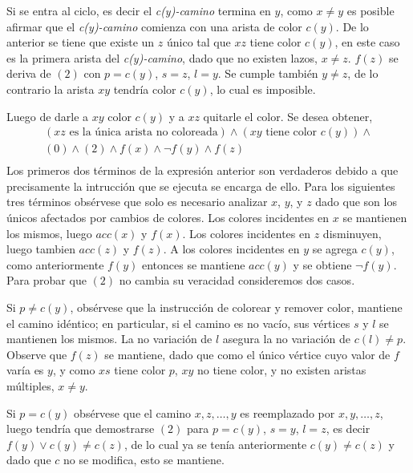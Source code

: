 \documentclass[../np-approximations.tex]{subfiles}
\begin{document}
Si se entra al ciclo, es decir el \emph{c(y)-camino} termina en $y$,
como $x \neq y$ es posible afirmar que el \emph{c(y)-camino} 
comienza con una arista de color $c(y)$. De lo anterior se tiene 
que existe un $z$ único tal que $xz$ tiene color $c(y)$, en este 
caso es la primera arista del \emph{c(y)-camino}, dado que no 
existen lazos, $x \neq z$. $f(z)$ se deriva de $(2)$ con $p=c(y)$,
$s=z$, $l=y$. Se cumple también $y \neq z$, de lo contrario la 
arista $xy$ tendría color $c(y)$, lo cual es imposible.

Luego de darle a $xy$ color $c(y)$ y a $xz$ quitarle el color.
Se desea obtener,
\begin{multline*}
	(xz \text{ es la única arista no coloreada}) \wedge
	(xy \text{ tiene color } c(y)) \wedge \\
	(0) \wedge (2) \wedge f(x) \wedge \neg f(y) \wedge f(z) \\
\end{multline*}
Los primeros dos términos de la expresión anterior son verdaderos 
debido a que precisamente la intrucción que se ejecuta se encarga 
de ello. Para los siguientes tres términos obsérvese que solo es 
necesario analizar $x$, $y$, y $z$ dado que son los únicos 
afectados por cambios de colores. Los colores incidentes en $x$ se 
mantienen los mismos, luego $acc(x)$ y $f(x)$. Los colores 
incidentes en $z$ disminuyen, luego tambien $acc(z)$ y $f(z)$. A 
los colores incidentes en $y$ se agrega $c(y)$, como anteriormente
$f(y)$ entonces se mantiene $acc(y)$ y se obtiene $\neg f(y)$. Para 
probar que $(2)$ no cambia su veracidad consideremos dos casos.

Si $p \neq c(y)$, obsérvese que la instrucción de colorear y remover
color, mantiene el camino idéntico; en particular, si el camino es 
no vacío, sus vértices $s$ y $l$ se mantienen los mismos. La no 
variación de $l$ asegura la no variación de $c(l) \neq p$. Observe 
que $f(z)$ se mantiene, dado que como el único vértice cuyo valor 
de $f$ varía es $y$, y como $xs$ tiene color $p$, $xy$ no tiene 
color, y no existen aristas múltiples, $x \neq y$.

Si $p = c(y)$ obsérvese que el camino $x,z,\dots,y$ es reemplazado 
por $x,y,\dots,z$, luego tendría que demostrarse $(2)$ para
$p=c(y)$, $s=y$, $l=z$, es decir $f(y) \vee c(y) \neq c(z)$, de lo 
cual ya se tenía anteriormente $c(y) \neq c(z)$ y dado que $c$ no 
se modifica, esto se mantiene.
\end{document}
